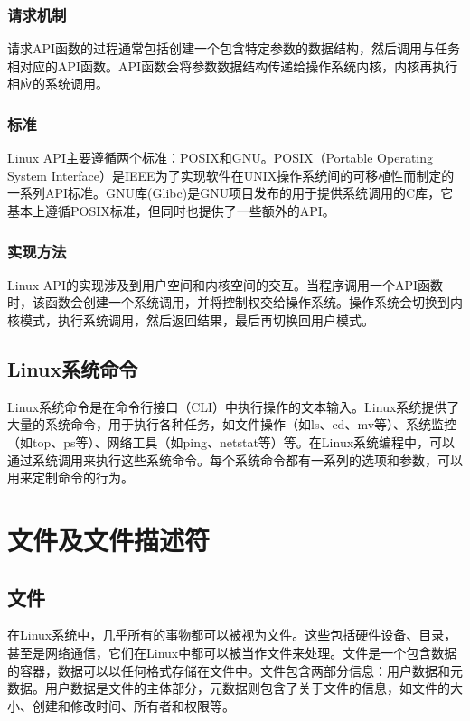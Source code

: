 \documentclass[12pt, a4paper, oneside]{ctexbook}
\numberwithin{figure}{section}
\begin{document}
\subsubsection{请求机制}
    
请求API函数的过程通常包括创建一个包含特定参数的数据结构，然后调用与任务相对应的API函数。API函数会将参数数据结构传递给操作系统内核，内核再执行相应的系统调用。

\subsubsection{标准}
    
Linux API主要遵循两个标准：POSIX和GNU。POSIX（Portable Operating System Interface）是IEEE为了实现软件在UNIX操作系统间的可移植性而制定的一系列API标准。GNU库(Glibc)是GNU项目发布的用于提供系统调用的C库，它基本上遵循POSIX标准，但同时也提供了一些额外的API。
    
\subsubsection{实现方法}
    
Linux API的实现涉及到用户空间和内核空间的交互。当程序调用一个API函数时，该函数会创建一个系统调用，并将控制权交给操作系统。操作系统会切换到内核模式，执行系统调用，然后返回结果，最后再切换回用户模式。
    
\subsection{Linux系统命令}
    
Linux系统命令是在命令行接口（CLI）中执行操作的文本输入。Linux系统提供了大量的系统命令，用于执行各种任务，如文件操作（如ls、cd、mv等）、系统监控（如top、ps等）、网络工具（如ping、netstat等）等。在Linux系统编程中，可以通过系统调用来执行这些系统命令。每个系统命令都有一系列的选项和参数，可以用来定制命令的行为。

\section{文件及文件描述符}

\subsection{文件}

在Linux系统中，几乎所有的事物都可以被视为文件。这些包括硬件设备、目录，甚至是网络通信，它们在Linux中都可以被当作文件来处理。文件是一个包含数据的容器，数据可以以任何格式存储在文件中。文件包含两部分信息：用户数据和元数据。用户数据是文件的主体部分，元数据则包含了关于文件的信息，如文件的大小、创建和修改时间、所有者和权限等。
\end{document}
